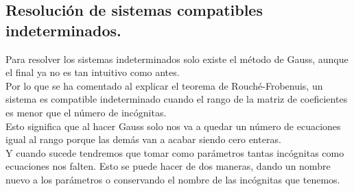 \documentclass[a4paper,11pt,answers]{exam}
\begin{document}
\subsection{Resolución de sistemas compatibles indeterminados.}
Para resolver los sistemas indeterminados solo existe el método de Gauss, aunque el final ya no es tan intuitivo como antes.\\

Por lo que se ha comentado al explicar el teorema de Rouché-Frobenuis, un sistema es compatible indeterminado cuando el rango de la matriz de coeficientes es menor que el número de incógnitas.\\
Esto significa que al hacer Gauss solo nos va a quedar un número de ecuaciones igual al rango porque las demás van a acabar siendo cero enteras.\\
Y cuando sucede tendremos que tomar como parámetros tantas incógnitas como ecuaciones nos falten. Esto se puede hacer de dos maneras, dando un nombre nuevo a los parámetros o conservando el nombre de las incógnitas que tenemos.\\
\end{document}
